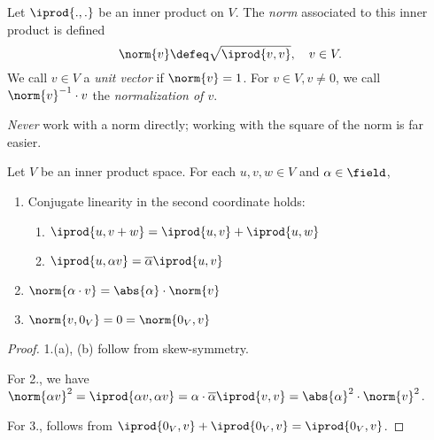 \begin{definition}
    Let $\iprod{.,.}$ be an inner product on $V$. The \emph{norm} associated to this inner product is defined \[
    \norm{v} \defeq \sqrt{\iprod{v,v}}, \quad v \in V.
    \]
    We call $v \in V$ a \emph{unit vector} if $\norm{v} = 1$. For $v \in V, v \neq 0$, we call $\norm{v}^{-1} \cdot v$ the \emph{normalization of $v$}.
\end{definition}

\begin{remark}
    \emph{Never} work with a norm directly; working with the square of the norm is far easier.
\end{remark}

\begin{proposition}
    Let $V$ be an inner product space. For each $u, v, w \in V$ and $\alpha \in \field$,
    \begin{enumerate}
        \item Conjugate linearity in the second coordinate holds:
        \begin{enumerate}
            \item $\iprod{u, v + w} = \iprod{u, v} + \iprod{u, w}$
            \item $\iprod{u, \alpha v} = \overline{\alpha} \iprod{u, v}$
        \end{enumerate}
        \item $\norm{\alpha\cdot  v} = \abs{\alpha} \cdot \norm{v}$
        \item $\norm{v, 0_V} = 0 = \norm{0_V, v}$
    \end{enumerate}
\end{proposition}
\begin{proof}
    1.(a), (b) follow from skew-symmetry.

    For 2., we have $\norm{\alpha v}^2 = \iprod{\alpha v, \alpha v} = \alpha \cdot \overline{\alpha} \iprod{v, v} = \abs{\alpha}^2 \cdot \norm{v}^2$.

    For 3., follows from $\iprod{0_V, v} + \iprod{0_V, v} = \iprod{0_V, v}$.
\end{proof}

